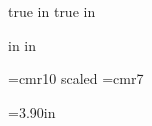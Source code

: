 %
%



\eightpoint

\sloppy

\newif\iflong %
\longfalse
\def\piflong#1{\iflong#1
\else\fi}%
\long\def\lpiflong#1{\iflong#1
\else\fi}%

\def\xpair{{x_1,x_2}}

 true in
 true in
\nopagenumbers

\def\complex{{\bf C}}
\def\real{{\bf R}}
\def\field{{\bf F}}
\def\polynomial{{\cal P}}
\def\dim{{\rm dim}\ }
\def\mnull{{\rm null}\ }
\def\mrange{{\rm range}\ }
\def\mspan{{\rm span}\ }
\def\linear{{\cal L}}
\def\mapmatrix{{\cal M}}

 in
 in
\hsize=8in
\vsize=10.75in
\parindent=0pt

\font\bigger =cmr10 scaled
\font\smallfont=cmr7

\def\strutA#1#2{\vrule height#1 depth#2 width0pt}
\def\chapter#1{\vskip 5pt {\bigger #1}}

=3.90in
\newbox\bigbox


\def\dtablestart#1#2{\halign\bgroup \vtop{\parindent=0pt\hsize=#1\strut##\strut}\hfil&\hskip 0.10 in\vtop{\parindent=0pt\hsize=#2\strut##\strut}\cr}
\def\dtableend{\egroup}


